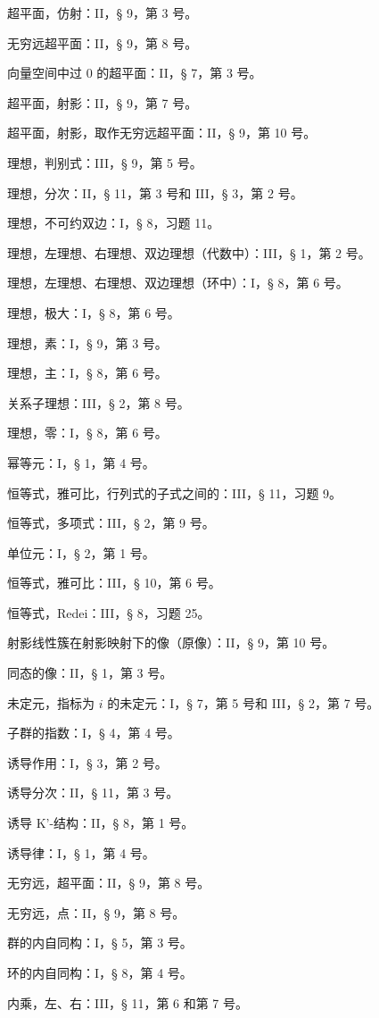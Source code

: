 超平面，仿射：II，§ 9，第 3 号。

无穷远超平面：II，§ 9，第 8 号。

向量空间中过 0 的超平面：II，§ 7，第 3 号。

超平面，射影：II，§ 9，第 7 号。

超平面，射影，取作无穷远超平面：II，§ 9，第 10 号。

理想，判别式：III，§ 9，第 5 号。

理想，分次：II，§ 11，第 3 号和 III，§ 3，第 2 号。

理想，不可约双边：I，§ 8，习题 11。

理想，左理想、右理想、双边理想（代数中）：III，§ 1，第 2 号。

理想，左理想、右理想、双边理想（环中）：I，§ 8，第 6 号。

理想，极大：I，§ 8，第 6 号。

理想，素：I，§ 9，第 3 号。

理想，主：I，§ 8，第 6 号。

关系子理想：III，§ 2，第 8 号。

理想，零：I，§ 8，第 6 号。

幂等元：I，§ 1，第 4 号。

恒等式，雅可比，行列式的子式之间的：III，§ 11，习题 9。

恒等式，多项式：III，§ 2，第 9 号。

单位元：I，§ 2，第 1 号。

恒等式，雅可比：III，§ 10，第 6 号。

恒等式，Redei：III，§ 8，习题 25。

射影线性簇在射影映射下的像（原像）：II，§ 9，第 10 号。

同态的像：II，§ 1，第 3 号。

未定元，指标为 \(i\) 的未定元：I，§ 7，第 5 号和 III，§ 2，第 7 号。

子群的指数：I，§ 4，第 4 号。

诱导作用：I，§ 3，第 2 号。

诱导分次：II，§ 11，第 3 号。

诱导 K'-结构：II，§ 8，第 1 号。

诱导律：I，§ 1，第 4 号。

无穷远，超平面：II，§ 9，第 8 号。

无穷远，点：II，§ 9，第 8 号。

群的内自同构：I，§ 5，第 3 号。

环的内自同构：I，§ 8，第 4 号。

内乘，左、右：III，§ 11，第 6 和第 7 号。


